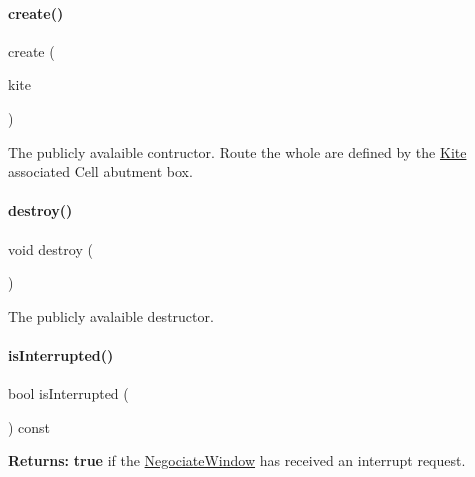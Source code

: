 \paragraph{\texorpdfstring{create()}{create()}}
{\footnotesize\ttfamily create (\begin{DoxyParamCaption}\item[{\mbox{\hyperlink{classKite_1_1KiteEngine}{Kite\+Engine}} $\ast$}]{kite }\end{DoxyParamCaption})\hspace{0.3cm}{\ttfamily [static]}}

The publicly avalaible contructor. Route the whole are defined by the \mbox{\hyperlink{namespaceKite}{Kite}} associated Cell abutment box. \mbox{\label{classKite_1_1NegociateWindow_a3a80b6032f86a56bec74609034b3246f}} 
\paragraph{\texorpdfstring{destroy()}{destroy()}}
{\footnotesize\ttfamily void destroy (\begin{DoxyParamCaption}{ }\end{DoxyParamCaption})}

The publicly avalaible destructor. \mbox{\label{classKite_1_1NegociateWindow_aa1a08014471e19352a5efdabad3a87cb}} 
\paragraph{\texorpdfstring{is\+Interrupted()}{isInterrupted()}}
{\footnotesize\ttfamily bool is\+Interrupted (\begin{DoxyParamCaption}{ }\end{DoxyParamCaption}) const\hspace{0.3cm}{\ttfamily [inline]}}

{\bfseries Returns\+:} {\bfseries true} if the \mbox{\hyperlink{classKite_1_1NegociateWindow}{Negociate\+Window}} has received an interrupt request. \mbox{\label{classKite_1_1NegociateWindow_af7373bd3a4ee8fcf28a316230ed37fc0}} 
